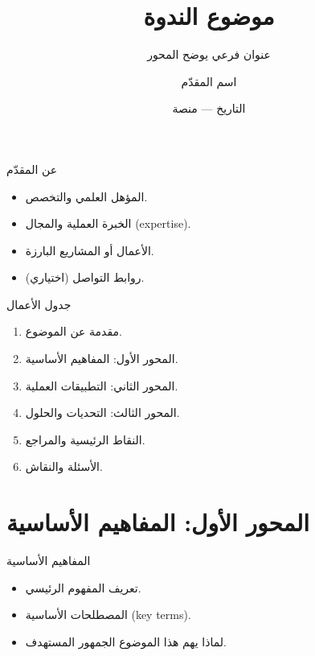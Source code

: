 \documentclass[aspectratio=169,11pt]{beamer}
\title{موضوع الندوة}
\subtitle{عنوان فرعي يوضح المحور}
\author{اسم المقدّم}
\institute{الجهة المنظِّمة}
\date{التاريخ — منصة \textEN{[platform]}}
\let\textEN\textenglish
\begin{document}
\begin{frame}[plain]
\titlepage
\end{frame}

\begin{frame}{عن المقدّم}
\begin{itemize}
  \item المؤهل العلمي والتخصص.
  \item الخبرة العملية والمجال \textEN{(expertise)}.
  \item الأعمال أو المشاريع البارزة.
  \item روابط التواصل (اختياري).
\end{itemize}
\end{frame}

\begin{frame}{جدول الأعمال}
\begin{enumerate}
  \item مقدمة عن الموضوع.
  \item المحور الأول: المفاهيم الأساسية.
  \item المحور الثاني: التطبيقات العملية.
  \item المحور الثالث: التحديات والحلول.
  \item النقاط الرئيسية والمراجع.
  \item الأسئلة والنقاش.
\end{enumerate}
\end{frame}

\section{المحور الأول: المفاهيم الأساسية}
\begin{frame}{المفاهيم الأساسية}
\begin{itemize}
  \item تعريف المفهوم الرئيسي.
  \item المصطلحات الأساسية \textEN{(key terms)}.
  \item لماذا يهم هذا الموضوع الجمهور المستهدف.
\end{itemize}
\end{frame}
\end{document}
